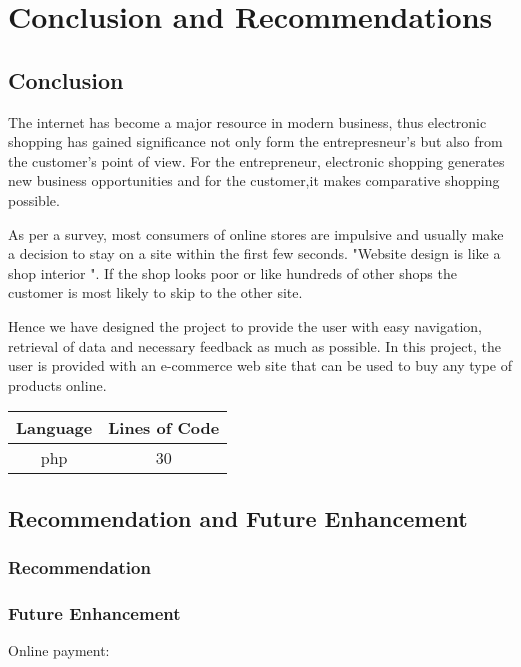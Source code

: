 \chapter{Conclusion and Recommendations}

\section{Conclusion}
The internet has become a major resource in modern business, thus electronic shopping has gained significance not only form the entrepresneur's but also from the customer's point of view. For the entrepreneur, electronic shopping generates new business opportunities and for the customer,it makes comparative shopping possible.

As per a survey, most consumers of online stores are impulsive and usually make a decision to stay on a site within the first few seconds. "Website design is like a shop interior ". If the shop looks poor or like hundreds of other shops the customer is most likely to skip to the other site.

Hence we have designed the project to provide the user with easy navigation, retrieval of data and necessary feedback as much as possible. In this project, the user is provided with an e-commerce web site that can be used to buy any type of products online.

\begin{tabular}{|c|c|}
\hline 
Language & Lines of Code \\ 
\hline 
php & 30 \\ 
\hline 
\end{tabular} 


\section{Recommendation and Future Enhancement}

\subsection{Recommendation}

\subsection{Future Enhancement}
\begin{description}
	\item[Online payment:]
\end{description}
 	
